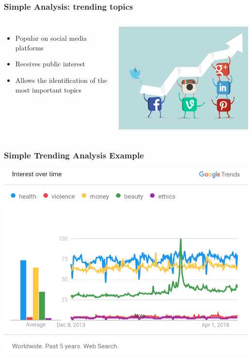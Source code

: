 \documentclass[xcolor=table]{beamer}
\begin{document}
\begin{frame}
\frametitle{Simple Analysis: trending topics}
\begin{columns}
           \begin{itemize}
    \item Popular on social media platforms
    \item Receives public interest
    \item Allows the identification of the most important topics
    \end{itemize}
        \centering
        \includegraphics[scale=0.4]{img0003.png}
\end{columns}


\end{frame}


\begin{frame}
\frametitle{Simple Trending Analysis Example }
\includegraphics[width=.9\columnwidth]{trends}
\end{frame}
\end{document}

